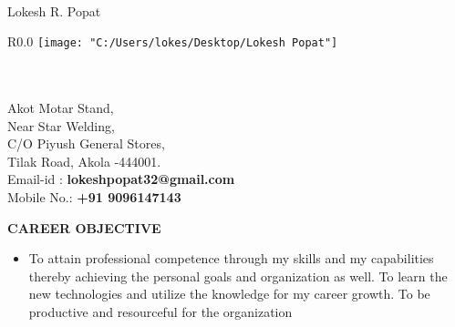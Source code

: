 \documentclass[a4paper,20pt]{article}
\newcommand{\lsep}{-0.5cm}
\begin{document}
	
\hspace{0.5cm}\\[-0.2cm]


 {\huge  {\begin{center}
	\Huge	Lokesh R. Popat
		\end{center}}}
	
	



\begin{wrapfigure}{R}{0.0\linewidth}
	\hspace{15em}
\texttt{[image: "C:/Users/lokes/Desktop/Lokesh Popat"]}
\end{wrapfigure}
\indent \\
\indent \\
\indent Akot Motar Stand, \\ 
\indent Near Star Welding,\\
\indent C/O Piyush General Stores, \\
\indent Tilak Road, Akola -444001.\\
\indent Email-id : \textbf{lokeshpopat32@gmail.com} \\
\indent Mobile No.: \textbf{+91 9096147143} \\
	 \newline 



\textbf{\large {CAREER OBJECTIVE}} \\[\lsep]
\begin{itemize}
	\item[] \noindent To attain professional competence through my skills and my capabilities thereby achieving the personal goals and organization as well. To learn the new technologies and utilize the knowledge for my career growth. To be productive and resourceful for the organization
	
\end{itemize}
\end{document}
